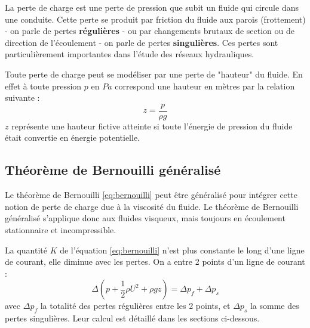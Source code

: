 La perte de charge est une perte de pression que subit un fluide qui circule dans une conduite. Cette perte se produit par friction du fluide aux parois (frottement) - on parle de pertes \textbf{régulières} - ou par changements brutaux de section ou de direction de l'écoulement - on parle de pertes \textbf{singulières}. Ces pertes sont particulièrement importantes dans l'étude des réseaux hydrauliques.

Toute perte de charge peut se modéliser par une perte de "hauteur" du fluide. En effet à toute pression $p$ en $Pa$ correspond une hauteur en mètres par la relation suivante :
%
\begin{equation}
z = \frac{p}{\rho g}
\end{equation}
%
$z$ représente une hauteur fictive atteinte si toute l'énergie de pression du fluide était convertie en énergie potentielle.


\subsection{Théorème de Bernouilli généralisé}

Le théorème de Bernouilli \eqref{eq:bernouilli} peut être généralisé pour intégrer cette notion de perte de charge due à la viscosité du fluide. Le théorème de Bernouilli généralisé s'applique donc aux fluides visqueux, mais toujours en écoulement stationnaire et incompressible.

La quantité $K$ de l'équation \eqref{eq:bernouilli} n'est plus constante le long d'une ligne de courant, elle diminue avec les pertes. On a entre 2 points d'un ligne de courant :
%
\begin{equation}
\Delta \left( p + \frac{1}{2}\rho U^2 + \rho g z \right) = \Delta p_f + \Delta p_s
\end{equation}
%
avec $\Delta p_f$ la totalité des pertes régulières entre les 2 points, et $\Delta p_s$ la somme des pertes singulières. Leur calcul est détaillé dans les sections ci-dessous.


